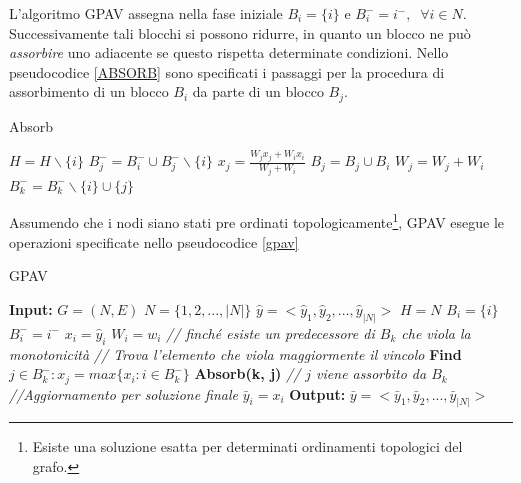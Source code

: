 \documentclass[12pt]{report}
\begin{document}
\newline
\newline
L'algoritmo GPAV assegna nella fase iniziale $B_i = \{i\}$ e $B_i^{-} = i^{-}, \;\; \forall i \in N$. Successivamente tali blocchi si possono ridurre, in quanto un blocco ne può \emph{assorbire} uno adiacente se questo rispetta determinate condizioni.  Nello pseudocodice \ref{ABSORB} sono specificati i passaggi per la procedura di assorbimento di un blocco $B_i$ da parte di un blocco $B_j$.
\begin{algorithm}[!htp]
\caption{Absorb}\label{ABSORB}
\begin{algorithmic}[1]
\State $ H = H \backslash \{i\} $
\State $ B_j^{-} = B_i^{-}\cup B_j^{-}\backslash \{i\} $
\State $x_j = \frac{W_j x_j + W_i x_i}{W_j + W_i}$
\State $B_j = B_j \cup B_i$
\State $W_j = W_j + W_i$
\State $B_k^{-} = B_k^{-}\backslash \{i\} \cup \{j\}$ 
\EndFor
\EndProcedure
\end{algorithmic}
\end{algorithm}
\newpage
Assumendo che i nodi siano stati pre ordinati topologicamente\footnote{\footnotesize{Esiste una soluzione esatta per determinati ordinamenti topologici del grafo\cite{optimGPAV}.}}, GPAV esegue le operazioni specificate nello pseudocodice \ref{gpav}

\begin{algorithm}[!htp]
\caption{GPAV}\label{gpav}
\begin{algorithmic}[1]
\State \textbf{Input: }
\State $G = (N, E)$
\State $N = \{1, 2, ..., |N|\} $ 
\State $\hat{y} = <\hat{y}_1, \hat{y}_2, ...,\hat{y}_{|N|}>$
\State $ H = N $
\State $B_i = \{i\}$ 
\State $B_i^{-} = i^{-}$
\State $x_i = \hat{y}_i$
\State $W_i = w_i$
\EndFor
{}
\State \emph{// finché esiste un predecessore di $B_{k}$ che viola la monotonicità}
\State \emph{// Trova l'elemento che viola maggiormente il vincolo}
\State \textbf{Find} $j \in B_k^{-}: x_j = max\{x_i : i \in B_k^{-}\}$ 
\State \textbf{Absorb(k, j)} \emph{// $j$ viene assorbito da $B_k$}
\EndWhile
\EndFor
\State \emph{//Aggiornamento per soluzione finale }  
\State $\bar{y}_i = x_i$  
\EndFor
\EndFor
\EndProcedure
\State \textbf{Output: }
\State $\bar{y} = <\bar{y}_1, \bar{y}_2, ...,\bar{y}_{|N|}>$
\end{algorithmic}
\end{algorithm}
\end{document}
